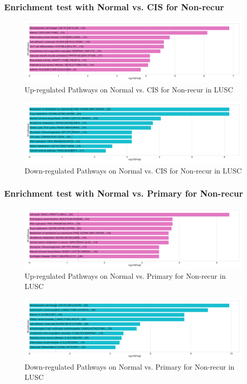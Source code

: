 \documentclass{beamer}
\begin{document}
    \begin{frame}
        \frametitle{Enrichment test with Normal vs. CIS for Non-recur}

        \begin{figure}
            \includegraphics[width=0.8 \linewidth]{figures/DEG/Enrichment/STAR.SQC.Nonrecur.Normal-CIS.Up.KEGG.pdf}
            \caption{Up-regulated Pathways on Normal vs. CIS for Non-recur in LUSC}
        \end{figure}

        \begin{figure}
            \includegraphics[width=0.8 \linewidth]{figures/DEG/Enrichment/STAR.SQC.Nonrecur.Normal-CIS.Down.KEGG.pdf}
            \caption{Down-regulated Pathways on Normal vs. CIS for Non-recur in LUSC}
        \end{figure}
    \end{frame}

    \begin{frame}
        \frametitle{Enrichment test with Normal vs. Primary for Non-recur}

        \begin{figure}
            \includegraphics[width=0.8 \linewidth]{figures/DEG/Enrichment/STAR.SQC.Nonrecur.Normal-Primary.Up.KEGG.pdf}
            \caption{Up-regulated Pathways on Normal vs. Primary for Non-recur in LUSC}
        \end{figure}

        \begin{figure}
            \includegraphics[width=0.8 \linewidth]{figures/DEG/Enrichment/STAR.SQC.Nonrecur.Normal-Primary.Down.KEGG.pdf}
            \caption{Down-regulated Pathways on Normal vs. Primary for Non-recur in LUSC}
        \end{figure}
    \end{frame}
\end{document}
